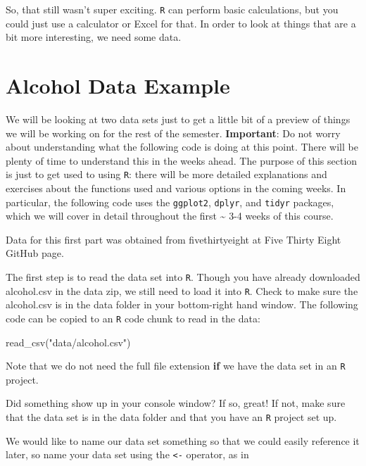 \documentclass[
]{book}
\newenvironment{Shaded}{\begin{snugshade}}{\end{snugshade}}
\newcommand{\FunctionTok}[1]{\textcolor[rgb]{0.00,0.00,0.00}{#1}}
\newcommand{\NormalTok}[1]{#1}
\newcommand{\StringTok}[1]{\textcolor[rgb]{0.31,0.60,0.02}{#1}}
\begin{document}
So, that still wasn't super exciting. \texttt{R} can perform basic calculations, but you could just use a calculator or Excel for that. In order to look at things that are a bit more interesting, we need some data.

\hypertarget{alcohol-data-example}{%
\section{Alcohol Data Example}\label{alcohol-data-example}}

We will be looking at two data sets just to get a little bit of a preview of things we will be working on for the rest of the semester. \textbf{Important}: Do not worry about understanding what the following code is doing at this point. There will be plenty of time to understand this in the weeks ahead. The purpose of this section is just to get used to using \texttt{R}: there will be more detailed explanations and exercises about the functions used and various options in the coming weeks. In particular, the following code uses the \texttt{ggplot2}, \texttt{dplyr}, and \texttt{tidyr} packages, which we will cover in detail throughout the first \textasciitilde{} 3-4 weeks of this course.

Data for this first part was obtained from fivethirtyeight at Five Thirty Eight GitHub page.

The first step is to read the data set into \texttt{R}. Though you have already downloaded alcohol.csv in the data zip, we still need to load it into \texttt{R}. Check to make sure the alcohol.csv is in the data folder in your bottom-right hand window. The following code can be copied to an \texttt{R} code chunk to read in the data:

\begin{Shaded}
\begin{Highlighting}[]
\FunctionTok{read\_csv}\NormalTok{(}\StringTok{"data/alcohol.csv"}\NormalTok{)}
\end{Highlighting}
\end{Shaded}

Note that we do not need the full file extension \textbf{if} we have the data set in an \texttt{R} project.

Did something show up in your console window? If so, great! If not, make sure that the data set is in the data folder and that you have an \texttt{R} project set up.

We would like to name our data set something so that we could easily reference it later, so name your data set using the \texttt{\textless{}-} operator, as in
\end{document}
